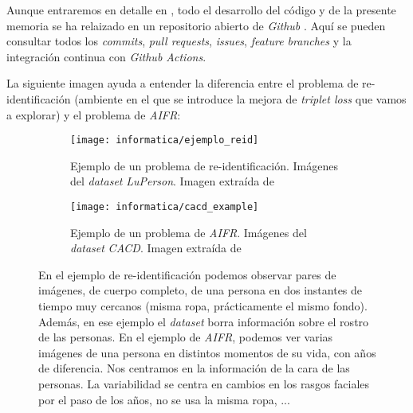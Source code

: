 Aunque entraremos en detalle en , todo el desarrollo del código y de la presente memoria se ha relaizado en un repositorio abierto de \textit{Github} \cite{informatica:repogithub}. Aquí se pueden consultar todos los \textit{commits}, \textit{pull requests}, \textit{issues}, \textit{feature branches} y la integración continua con \textit{Github Actions}.

La siguiente imagen ayuda a entender la diferencia entre el problema de re-identificación (ambiente en el que se introduce la mejora de \textit{triplet loss} que vamos a explorar) y el problema de \textit{AIFR}:

\begin{figure}[H]
    \centering
    \ajustarsubcaptions
    \begin{subfigure}{0.4\textwidth}
        \texttt{[image: informatica/ejemplo\_reid]}
        \caption{Ejemplo de un problema de re-identificación. Imágenes del \textit{dataset} \textit{LuPerson}. Imagen extraída de \cite{informatica:luperson}}
    \end{subfigure}%
    \begin{subfigure}{0.6\textwidth}
        \texttt{[image: informatica/cacd\_example]}
        \caption{Ejemplo de un problema de \textit{AIFR}. Imágenes del \textit{dataset} \textit{CACD}. Imagen extraída de \cite{informatica:paper_cacd}}
    \end{subfigure}

    \caption{En el ejemplo de re-identificación podemos observar pares de imágenes, de cuerpo completo, de una persona en dos instantes de tiempo muy cercanos (misma ropa, prácticamente el mismo fondo). Además, en ese ejemplo el \textit{dataset} borra información sobre el rostro de las personas. En el ejemplo de \textit{AIFR}, podemos ver varias imágenes de una persona en distintos momentos de su vida, con años de diferencia. Nos centramos en la información de la cara de las personas. La variabilidad se centra en cambios en los rasgos faciales por el paso de los años, no se usa la misma ropa, ...}
\end{figure}


